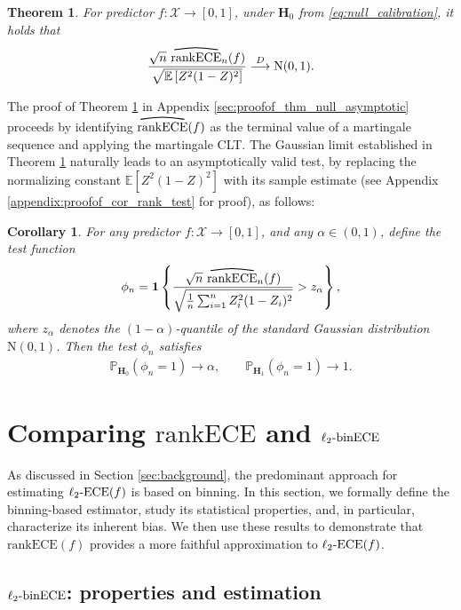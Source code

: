 \documentclass[11pt]{article}
\numberwithin{equation}{section}
\newtheorem{theorem}{Theorem}[section]
\newtheorem{corollary}{Corollary}[section]
\theoremstyle{definition}
\newcommand{\E}{\mathbb{E}}
\renewcommand{\P}{\mathbb{P}}
\newcommand{\cX}{\mathcal{X}}
\newcommand{\one}{\bm{1}}
\newcommand{\ra}{\rightarrow}
\newcommand{\dto}{\overset{D}{\longrightarrow}}
\newcommand{\myoverline}[2][3.5em]{%
  \overset{%
    \tikz[baseline=-0.1ex]{
      \draw[line width=0.75pt]
        (0,0) .. controls (#1/2,0.5ex) .. (#1,0);
    }%
  }{#2}%
}
\newcommand{\ECE}{\mathrm{ECE}}
\newcommand{\lECE}{\ell_2\textnormal{-}\ECE}
\newcommand{\binECE}{\mathrm{binECE}}
\newcommand{\lbinECE}{\ell_2\textnormal{-}\binECE}
\newcommand{\rankECE}{\mathrm{rankECE}}
\newcommand{\hatrankECE}{\myoverline{\rankECE}}
\begin{document}
\begin{theorem}\label{thm:null_asymptotic}
    For predictor $f:\cX\ra[0,1]$, under $\bm H_0$ from \eqref{eq:null_calibration}, it holds that
    \begin{align*}
        \frac{\sqrt{n}\ \hatrankECE_n(f)}{\sqrt{\E\left[Z^2(1-Z)^2\right]}}
        \dto
        \mathrm N(0,1).
    \end{align*}
\end{theorem}
The proof of Theorem \ref{thm:null_asymptotic} in Appendix \ref{sec:proofof_thm_null_asymptotic} proceeds by identifying $\hatrankECE(f)$ as the terminal value of a martingale sequence and applying the martingale CLT. The Gaussian limit established in Theorem \ref{thm:null_asymptotic} naturally leads to an asymptotically valid test, by replacing the normalizing constant $\E\left[Z^2(1-Z)^2\right]$ with its sample estimate (see Appendix \ref{appendix:proofof_cor_rank_test} for proof), as follows:

\begin{corollary}\label{cor:rank_test_calib}
    For any predictor $f:\cX\ra[0,1]$, and any $\alpha\in(0,1)$, define the test function
\begin{align}\label{eq:phi_asymptotic_test}
    \phi_n
    =
    \one\left\{
        \frac{\sqrt{n}\ \hatrankECE_n(f)}
        {\sqrt{\frac{1}{n}\sum_{i=1}^{n}Z_i^2(1-Z_i)^2}}
        > z_{\alpha}
    \right\},
\end{align}
where $z_{\alpha}$ denotes the $(1-\alpha)$-quantile of the standard Gaussian distribution $\mathrm N(0,1)$.
Then the test $\phi_n$  satisfies
    \begin{align*}
        \P_{\bm H_0}(\phi_n=1)\ra\alpha,
        \qquad
        \P_{\bm H_1}(\phi_n=1)\ra 1.
    \end{align*}
\end{corollary}

\section{Comparing $\rankECE$ and $\lbinECE$}\label{sec:compare}

As discussed in Section \ref{sec:background}, the predominant approach for estimating $\lECE(f)$ is based on binning. In this section, we formally define the binning-based estimator, study its statistical properties, and, in particular, characterize its inherent bias. We then use these results to demonstrate that $\rankECE(f)$ provides a more faithful approximation to $\lECE(f)$.
\subsection{$\lbinECE$: properties and estimation}
\end{document}
